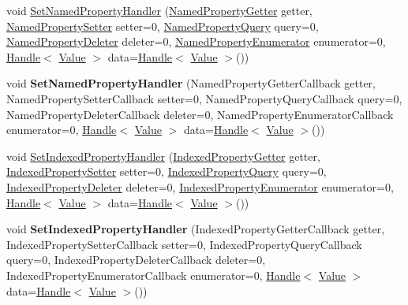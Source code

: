 \begin{DoxyCompactItemize}
\item 
void \hyperlink{classv8_1_1_object_template_aa80e9db593d8b954c4153082dc7a439d}{Set\+Named\+Property\+Handler} (\hyperlink{namespacev8_ab9effde41da1c073eddbd4a11a62bd0b}{Named\+Property\+Getter} getter, \hyperlink{namespacev8_a682b1fc46feab32605c4905612ffe870}{Named\+Property\+Setter} setter=0, \hyperlink{namespacev8_a0136e8102c101d9a39497f75daa9153b}{Named\+Property\+Query} query=0, \hyperlink{namespacev8_a7899471fae82b252750b81f41d5c1e26}{Named\+Property\+Deleter} deleter=0, \hyperlink{namespacev8_acbd04b83708cb5a80e73e0396f176e58}{Named\+Property\+Enumerator} enumerator=0, \hyperlink{classv8_1_1_handle}{Handle}$<$ \hyperlink{classv8_1_1_value}{Value} $>$ data=\hyperlink{classv8_1_1_handle}{Handle}$<$ \hyperlink{classv8_1_1_value}{Value} $>$())
\item 
\hypertarget{classv8_1_1_object_template_ac7bcbb6e2936ab38490680f7e1bfb787}{}void {\bfseries Set\+Named\+Property\+Handler} (Named\+Property\+Getter\+Callback getter, Named\+Property\+Setter\+Callback setter=0, Named\+Property\+Query\+Callback query=0, Named\+Property\+Deleter\+Callback deleter=0, Named\+Property\+Enumerator\+Callback enumerator=0, \hyperlink{classv8_1_1_handle}{Handle}$<$ \hyperlink{classv8_1_1_value}{Value} $>$ data=\hyperlink{classv8_1_1_handle}{Handle}$<$ \hyperlink{classv8_1_1_value}{Value} $>$())\label{classv8_1_1_object_template_ac7bcbb6e2936ab38490680f7e1bfb787}

\item 
void \hyperlink{classv8_1_1_object_template_af436aeb8132068d3678246f31515ff5a}{Set\+Indexed\+Property\+Handler} (\hyperlink{namespacev8_abf3be19b5157493da3859987cc50c6ab}{Indexed\+Property\+Getter} getter, \hyperlink{namespacev8_a3ca53e294b9b695b3777af904ca942b6}{Indexed\+Property\+Setter} setter=0, \hyperlink{namespacev8_ac84ffd0beb05009f30378ef45a065edf}{Indexed\+Property\+Query} query=0, \hyperlink{namespacev8_a3a7c18d62a0d1f2d12845051920be592}{Indexed\+Property\+Deleter} deleter=0, \hyperlink{namespacev8_a15ab299eff53946ab483b762a4cb20dc}{Indexed\+Property\+Enumerator} enumerator=0, \hyperlink{classv8_1_1_handle}{Handle}$<$ \hyperlink{classv8_1_1_value}{Value} $>$ data=\hyperlink{classv8_1_1_handle}{Handle}$<$ \hyperlink{classv8_1_1_value}{Value} $>$())
\item 
\hypertarget{classv8_1_1_object_template_a5542f9cf400563a8c2fda448144feee1}{}void {\bfseries Set\+Indexed\+Property\+Handler} (Indexed\+Property\+Getter\+Callback getter, Indexed\+Property\+Setter\+Callback setter=0, Indexed\+Property\+Query\+Callback query=0, Indexed\+Property\+Deleter\+Callback deleter=0, Indexed\+Property\+Enumerator\+Callback enumerator=0, \hyperlink{classv8_1_1_handle}{Handle}$<$ \hyperlink{classv8_1_1_value}{Value} $>$ data=\hyperlink{classv8_1_1_handle}{Handle}$<$ \hyperlink{classv8_1_1_value}{Value} $>$())\label{classv8_1_1_object_template_a5542f9cf400563a8c2fda448144feee1}


\end{DoxyCompactItemize}
